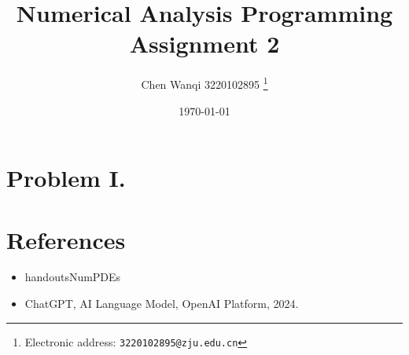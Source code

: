 \documentclass[a4paper]{article}
\begin{document}
\title{Numerical Analysis Programming Assignment 2}

\author{Chen Wanqi 3220102895
  \thanks{Electronic address: \texttt{3220102895@zju.edu.cn}}}


\date{\today}

\maketitle

\section*{Problem I.}

\section*{References}
\begin{itemize}
   \item handoutsNumPDEs
   \item ChatGPT, AI Language Model, OpenAI Platform, 2024.
\end{itemize}
\end{document}
